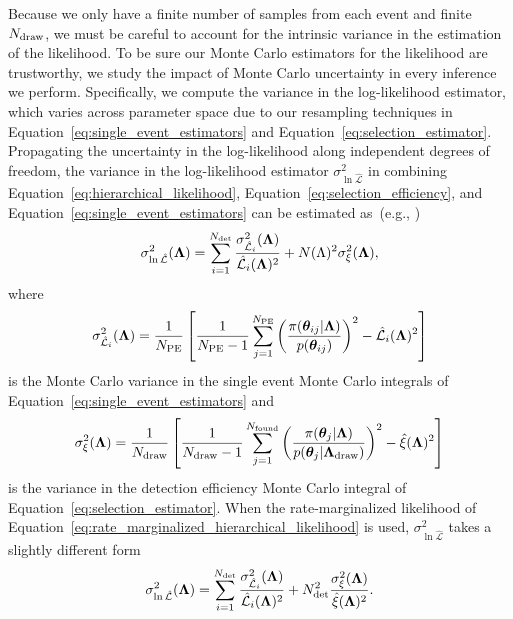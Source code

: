 Because we only have a finite number of samples from each event and finite $N_{\rm draw}$, we must be careful to account for the intrinsic variance in the estimation of the likelihood. 
To be sure our Monte Carlo estimators for the likelihood are trustworthy, we study the impact of Monte Carlo uncertainty in every inference we perform. 
Specifically, we compute the variance in the log-likelihood estimator, which varies across parameter space due to our resampling techniques in Equation~\eqref{eq:single_event_estimators} and Equation~\eqref{eq:selection_estimator}.
Propagating the uncertainty in the log-likelihood along independent degrees of freedom, the variance in the log-likelihood estimator $\sigma^2_{\ln \hat{\mathcal{L}}}$ in combining Equation~\eqref{eq:hierarchical_likelihood}, Equation~\eqref{eq:selection_efficiency}, and Equation~\eqref{eq:single_event_estimators} can be estimated as~(e.g., \citealt{Essick:2022ojx})
\begin{equation}
	\sigma^2_{\ln \hat{\mathcal{L}}}(\boldsymbol{\Lambda}) = \sum_{i=1}^{N_{\rm det}}\frac{\sigma^2_{\hat{\mathcal{L}}_i}(\boldsymbol{\Lambda})}{\hat{\mathcal{L}}_i(\boldsymbol{\Lambda})^2} + N(\Lambda)^2 \sigma^2_{\xi}(\boldsymbol{\Lambda}) ,
	\label{eq:variance_likelihood}
\end{equation}
where
\begin{equation}
	\sigma^2_{\hat{\mathcal{L}}_i}(\boldsymbol{\Lambda}) = \frac{1}{N_{\rm PE}}\left[\frac{1}{N_{\rm PE} -1 }\sum_{j=1}^{N_{\rm PE}}\left(\frac{\pi(\boldsymbol{\theta}_{ij}|\boldsymbol{\Lambda})}{p(\boldsymbol{\theta}_{ij})}\right)^2 - \hat{\mathcal{L}}_i(\boldsymbol{\Lambda})^2 \right]
\end{equation}
is the Monte Carlo variance in the single event Monte Carlo integrals of Equation~\eqref{eq:single_event_estimators} and 
\begin{equation}
	\sigma^2_{\xi}(\boldsymbol{\Lambda}) = \frac{1}{N_{\rm draw}}\left[\frac{1}{N_{\rm draw} -1}\sum_{j=1}^{N_{\rm found}}\left(\frac{\pi(\boldsymbol{\theta}_{j}|\boldsymbol{\Lambda})}{p(\boldsymbol{\theta}_{j}|\boldsymbol{\Lambda}_{\rm draw})}\right)^2 - \hat{\xi}(\boldsymbol{\Lambda})^2\right] 
\end{equation}
is the variance in the detection efficiency Monte Carlo integral of Equation~\eqref{eq:selection_estimator}.
When the rate-marginalized likelihood of Equation~\eqref{eq:rate_marginalized_hierarchical_likelihood} is used, $\sigma^2_{\ln \hat{\mathcal{L}}}$ takes a slightly different form
\begin{equation}
	\sigma^2_{\ln \hat{\mathcal{L}}}(\boldsymbol{\Lambda}) = \sum_{i=1}^{N_{\rm det}}\frac{\sigma^2_{\hat{\mathcal{L}}_i}(\boldsymbol{\Lambda})}{\hat{\mathcal{L}}_i(\boldsymbol{\Lambda})^2} + N_{\rm det}^2 \frac{\sigma^2_{\xi}(\boldsymbol{\Lambda})}{\hat{\xi}(\boldsymbol{\Lambda})^2}.
	\label{eq:variance_rate_marginalized_likelihood}
\end{equation}

